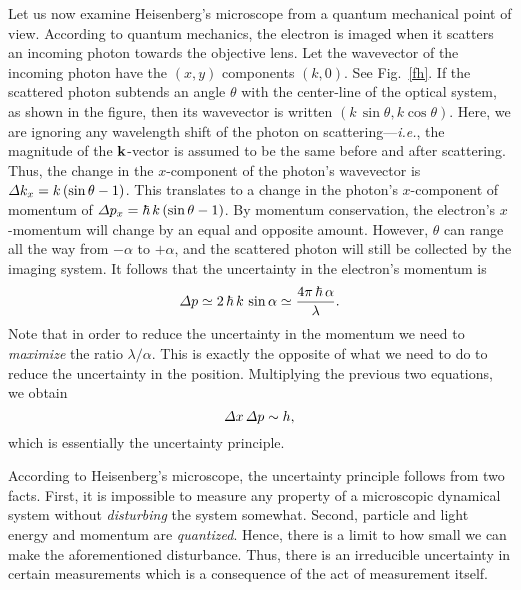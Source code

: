 Let us now examine Heisenberg's microscope from a quantum mechanical
point of view. According to quantum mechanics, the electron is imaged
when it scatters an incoming photon towards the objective lens.
Let the wavevector of the incoming photon have the $(x,y)$ 
components $(k,0)$. See Fig.~\ref{fh}. If the scattered photon
subtends an angle $\theta$ with the center-line of the optical
system, as shown in the figure, then its wavevector is written $(k\,\sin\theta, k\cos\theta)$. Here,
we are ignoring any wavelength shift of the photon on scattering---{\em i.e.},
the magnitude of the ${\bf k}$-vector is assumed to be the same before and after scattering.
Thus, the change in the $x$-component of the photon's wavevector
is ${\mit\Delta}k_x= k\,(\sin\theta-1)$. This translates to a change
in the photon's $x$-component of momentum of ${\mit\Delta}p_x = \hbar\,k\,(\sin\theta-1)$. By momentum conservation, the
electron's $x$-momentum will change by an equal and opposite
amount. However, $\theta$ can range all the way from $-\alpha$ to
$+\alpha$, and the scattered photon will still be collected by
the imaging system. It follows that the uncertainty in the electron's
momentum is
\begin{equation}
{\mit\Delta} p \simeq 2\,\hbar\,k\,\sin\alpha\simeq \frac{4\pi\,\hbar\,\alpha}{\lambda}. 
\end{equation}
Note that in order to reduce the uncertainty in the momentum we need to {\em maximize}\/
the ratio $\lambda/\alpha$. This is exactly the opposite of what we
need to do to reduce the uncertainty in the position. Multiplying the
previous two equations, we obtain
\begin{equation}
{\mit\Delta x}\,{\mit\Delta} p\sim h,
\end{equation}
which is essentially the uncertainty principle.

According to Heisenberg's microscope, the uncertainty principle follows
from two facts. First, it is impossible to measure any property of a microscopic dynamical system without
{\em disturbing}\/ the system somewhat. Second, particle and light energy and momentum are {\em quantized}.
Hence, there is a limit to how small we can make the aforementioned
disturbance. Thus, there is an irreducible uncertainty in certain measurements which is a consequence of the act of measurement itself.

